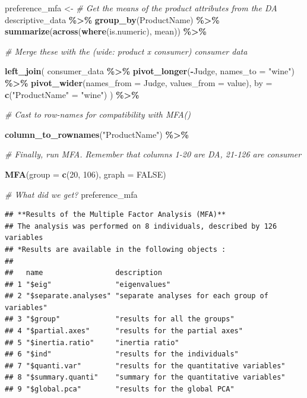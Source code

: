 \documentclass[
]{book}
\newenvironment{Shaded}{\begin{snugshade}}{\end{snugshade}}
\newcommand{\AttributeTok}[1]{\textcolor[rgb]{0.13,0.29,0.53}{#1}}
\newcommand{\CommentTok}[1]{\textcolor[rgb]{0.56,0.35,0.01}{\textit{#1}}}
\newcommand{\ConstantTok}[1]{\textcolor[rgb]{0.56,0.35,0.01}{#1}}
\newcommand{\DecValTok}[1]{\textcolor[rgb]{0.00,0.00,0.81}{#1}}
\newcommand{\FunctionTok}[1]{\textcolor[rgb]{0.13,0.29,0.53}{\textbf{#1}}}
\newcommand{\NormalTok}[1]{#1}
\newcommand{\OtherTok}[1]{\textcolor[rgb]{0.56,0.35,0.01}{#1}}
\newcommand{\SpecialCharTok}[1]{\textcolor[rgb]{0.81,0.36,0.00}{\textbf{#1}}}
\newcommand{\StringTok}[1]{\textcolor[rgb]{0.31,0.60,0.02}{#1}}
\begin{document}
\begin{Shaded}
\begin{Highlighting}[]
\NormalTok{preference\_mfa }\OtherTok{\textless{}{-}} 
  \CommentTok{\# Get the means of the product attributes from the DA}
\NormalTok{  descriptive\_data }\SpecialCharTok{\%\textgreater{}\%}
  \FunctionTok{group\_by}\NormalTok{(ProductName) }\SpecialCharTok{\%\textgreater{}\%}
  \FunctionTok{summarize}\NormalTok{(}\FunctionTok{across}\NormalTok{(}\FunctionTok{where}\NormalTok{(is.numeric), mean)) }\SpecialCharTok{\%\textgreater{}\%}
  
  \CommentTok{\# Merge these with the (wide: product x consumer) consumer data }
  
  \FunctionTok{left\_join}\NormalTok{(}
\NormalTok{    consumer\_data }\SpecialCharTok{\%\textgreater{}\%}
      \FunctionTok{pivot\_longer}\NormalTok{(}\SpecialCharTok{{-}}\NormalTok{Judge, }\AttributeTok{names\_to =} \StringTok{"wine"}\NormalTok{) }\SpecialCharTok{\%\textgreater{}\%}
      \FunctionTok{pivot\_wider}\NormalTok{(}\AttributeTok{names\_from =}\NormalTok{ Judge, }\AttributeTok{values\_from =}\NormalTok{ value),}
    \AttributeTok{by =} \FunctionTok{c}\NormalTok{(}\StringTok{"ProductName"} \OtherTok{=} \StringTok{"wine"}\NormalTok{)}
\NormalTok{  ) }\SpecialCharTok{\%\textgreater{}\%}
  
  \CommentTok{\# Cast to row{-}names for compatibility with \textasciigrave{}MFA()\textasciigrave{}}
  
  \FunctionTok{column\_to\_rownames}\NormalTok{(}\StringTok{"ProductName"}\NormalTok{) }\SpecialCharTok{\%\textgreater{}\%}
  
  \CommentTok{\# Finally, run MFA.  Remember that columns 1{-}20 are DA, 21{-}126 are consumer}
  
  \FunctionTok{MFA}\NormalTok{(}\AttributeTok{group =} \FunctionTok{c}\NormalTok{(}\DecValTok{20}\NormalTok{, }\DecValTok{106}\NormalTok{), }\AttributeTok{graph =} \ConstantTok{FALSE}\NormalTok{)}

\CommentTok{\# What did we get?}
\NormalTok{preference\_mfa}
\end{Highlighting}
\end{Shaded}

\begin{verbatim}
## **Results of the Multiple Factor Analysis (MFA)**
## The analysis was performed on 8 individuals, described by 126 variables
## *Results are available in the following objects :
## 
##   name                 description                                    
## 1 "$eig"               "eigenvalues"                                  
## 2 "$separate.analyses" "separate analyses for each group of variables"
## 3 "$group"             "results for all the groups"                   
## 4 "$partial.axes"      "results for the partial axes"                 
## 5 "$inertia.ratio"     "inertia ratio"                                
## 6 "$ind"               "results for the individuals"                  
## 7 "$quanti.var"        "results for the quantitative variables"       
## 8 "$summary.quanti"    "summary for the quantitative variables"       
## 9 "$global.pca"        "results for the global PCA"
\end{verbatim}
\end{document}
